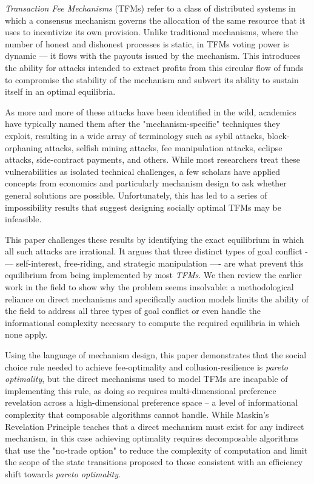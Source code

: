
\emph{Transaction Fee Mechanisms} (TFMs) refer to a class of distributed systems in which a consensus mechanism governs the allocation of the same resource that it uses to incentivize its own provision. Unlike traditional mechanisms, where the number of honest and dishonest processes is static, in TFMs voting power is dynamic — it flows with the payouts issued by the mechanism. This introduces the ability for attacks intended to extract profits from this circular flow of funds to compromise the stability of the mechanism and subvert its ability to sustain itself in an optimal equilibria.

As more and more of these attacks have been identified in the wild, academics have typically named them after the "mechanism-specific" techniques they exploit, resulting in a wide array of terminology such as sybil attacks, block-orphaning attacks, selfish mining attacks, fee manipulation attacks, eclipse attacks, side-contract payments, and others. While most researchers treat these vulnerabilities as isolated technical challenges, a few scholars have applied concepts from economics and particularly mechanism design to ask whether general solutions are possible. Unfortunately, this has led to a series of impossibility results that suggest designing socially optimal TFMs may be infeasible.

This paper challenges these results by identifying the exact equilibrium in which all such attacks are irrational. It argues that three distinct types of goal conflict -— self-interest, free-riding, and strategic manipulation —- are what prevent this equilibrium from being implemented by most \textit{TFMs}. We then review the earlier work in the field to show why the problem seems insolvable: a methodological reliance on direct mechanisms and specifically auction models limits the ability of the field to address all three types of goal conflict or even handle the informational complexity necessary to compute the required equilibria in which none apply.

Using the language of mechanism design, this paper demonstrates that the social choice rule needed to achieve fee-optimality and collusion-resilience is \textit{pareto optimality}, but the direct mechanisms used to model TFMs are incapable of implementing this rule, as doing so requires multi-dimensional preference revelation across a high-dimensional preference space -- a level of informational complexity that composable algorithms cannot handle. While Maskin's Revelation Principle teaches that a direct mechanism must exist for any indirect mechanism, in this case achieving optimality requires decomposable algorithms that use the "no-trade option" to reduce the complexity of computation and limit the scope of the state transitions proposed to those consistent with an efficiency shift towards \textit{pareto optimality}.

